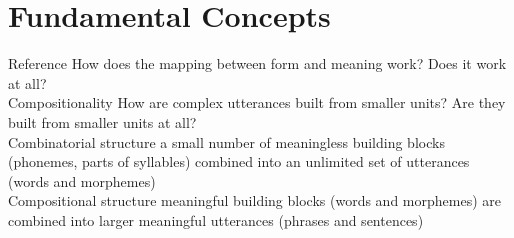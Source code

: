 \section{Fundamental Concepts}
\scriptsize{Reference} {\tiny How does the mapping between form and meaning work? Does it work at all?}\\
\scriptsize{Compositionality} {\tiny How are
complex utterances built from
smaller units? Are they built
from smaller units at all?}\\
\scriptsize{Combinatorial structure} {\tiny a small number of meaningless building blocks (phonemes, parts of syllables) combined into an unlimited set of utterances (words and morphemes)}\\
\scriptsize{Compositional structure} {\tiny meaningful building blocks (words and morphemes) are combined into larger meaningful utterances (phrases and sentences)}